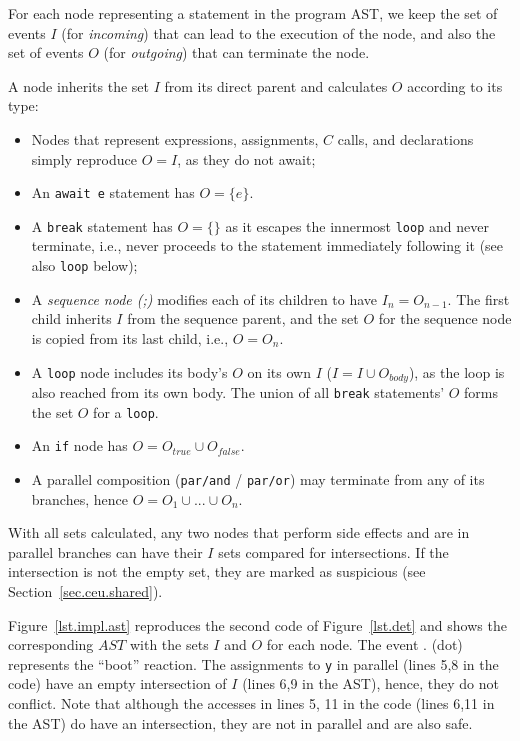 \documentclass{sigplanconf}
\newcommand{\code}[1] {{\small{\texttt{#1}}}}
\newcommand{\1}{\;}
\newcommand{\2}{\;\;}
\newcommand{\3}{\;\;\;}
\newcommand{\5}{\;\;\;\;\;}
\begin{document}
For each node representing a statement in the program AST, we keep the set of 
events $I$ (for \emph{incoming}) that can lead to the execution of the node, 
and also the set of events $O$ (for \emph{outgoing}) that can terminate the 
node.

A node inherits the set $I$ from its direct parent and calculates $O$ according 
to its type:
%
\begin{itemize}
%
\item Nodes that represent expressions, assignments, $C$ calls, and 
declarations simply reproduce $O=I$, as they do not await;
%
\item An \code{await e} statement has $O=\{e\}$.
%
\item A \code{break} statement has $O=\{\}$ as it escapes the innermost 
\code{loop} and never terminate, i.e., never proceeds to the statement 
immediately following it (see also \code{loop} below);
%
\item A \emph{sequence node (;)} modifies each of its children to have 
$I_n=O_{n-1}$.
The first child inherits $I$ from the sequence parent, and the set $O$ for the 
sequence node is copied from its last child, i.e., $O=O_n$.
%
\item A \code{loop} node includes its body's $O$ on its own $I$ ($I=I \cup 
O_{body}$), as the loop is also reached from its own body.
The union of all \code{break} statements' $O$ forms the set $O$ for a 
\code{loop}.
%
\item An \code{if} node has $O=O_{true} \cup O_{false}$.
%
\item A parallel composition (\code{par/and} / \code{par/or}) may terminate 
from any of its branches, hence $O = O_1 \cup ... \cup O_n$.
\end{itemize}

With all sets calculated, any two nodes that perform side effects and are in 
parallel branches can have their $I$ sets compared for intersections.
If the intersection is not the empty set, they are marked as suspicious (see 
Section~\ref{sec.ceu.shared}).

Figure~\ref{lst.impl.ast} reproduces the second code of Figure~\ref{lst.det} 
and shows the corresponding $AST$ with the sets $I$ and $O$ for each node.
The event $.$ (dot) represents the ``boot'' reaction.
The assignments to \code{y} in parallel (lines 5,8 in the code) have an empty 
intersection of $I$ (lines 6,9 in the AST), hence, they do not conflict.
Note that although the accesses in lines 5, 11 in the code (lines 6,11 in the 
AST) do have an intersection, they are not in parallel and are also safe.
\end{document}
